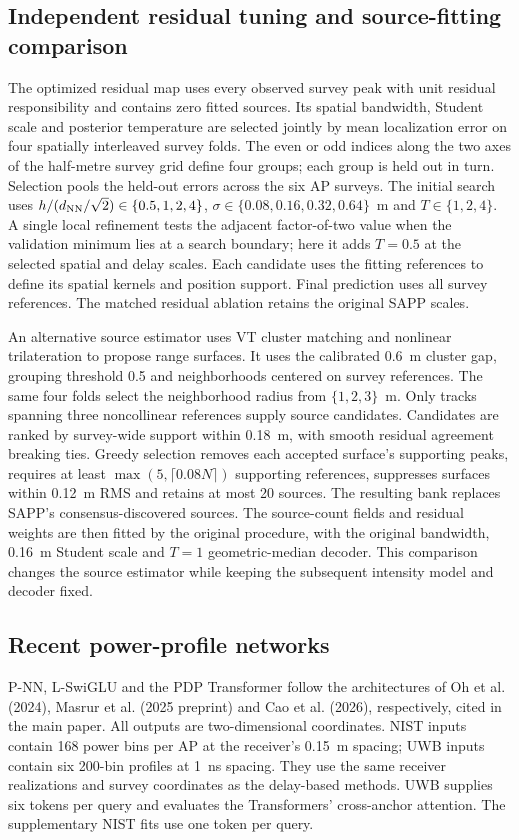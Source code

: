 \documentclass[10pt]{article}
\begin{document}
\subsection{Independent residual tuning and source-fitting comparison}
The optimized residual map uses every observed survey peak with unit residual responsibility and contains zero fitted sources. Its spatial bandwidth, Student scale and posterior temperature are selected jointly by mean localization error on four spatially interleaved survey folds. The even or odd indices along the two axes of the half-metre survey grid define four groups; each group is held out in turn. Selection pools the held-out errors across the six AP surveys. The initial search uses $h/(d_{\rm NN}/\sqrt2)\in\{0.5,1,2,4\}$, $\sigma\in\{0.08,0.16,0.32,0.64\}$~m and $T\in\{1,2,4\}$. A single local refinement tests the adjacent factor-of-two value when the validation minimum lies at a search boundary; here it adds $T=0.5$ at the selected spatial and delay scales. Each candidate uses the fitting references to define its spatial kernels and position support. Final prediction uses all survey references. The matched residual ablation retains the original SAPP scales.

An alternative source estimator uses VT cluster matching and nonlinear trilateration to propose range surfaces. It uses the calibrated 0.6~m cluster gap, grouping threshold 0.5 and neighborhoods centered on survey references. The same four folds select the neighborhood radius from $\{1,2,3\}$~m. Only tracks spanning three noncollinear references supply source candidates. Candidates are ranked by survey-wide support within 0.18~m, with smooth residual agreement breaking ties. Greedy selection removes each accepted surface's supporting peaks, requires at least $\max(5,\lceil0.08N\rceil)$ supporting references, suppresses surfaces within 0.12~m RMS and retains at most 20 sources. The resulting bank replaces SAPP's consensus-discovered sources. The source-count fields and residual weights are then fitted by the original procedure, with the original bandwidth, 0.16~m Student scale and $T=1$ geometric-median decoder. This comparison changes the source estimator while keeping the subsequent intensity model and decoder fixed.



\subsection{Recent power-profile networks}
P-NN, L-SwiGLU and the PDP Transformer follow the architectures of Oh et al. (2024), Masrur et al. (2025 preprint) and Cao et al. (2026), respectively, cited in the main paper. All outputs are two-dimensional coordinates. NIST inputs contain 168 power bins per AP at the receiver's 0.15~m spacing; UWB inputs contain six 200-bin profiles at 1~ns spacing. They use the same receiver realizations and survey coordinates as the delay-based methods. UWB supplies six tokens per query and evaluates the Transformers' cross-anchor attention. The supplementary NIST fits use one token per query.
\end{document}
